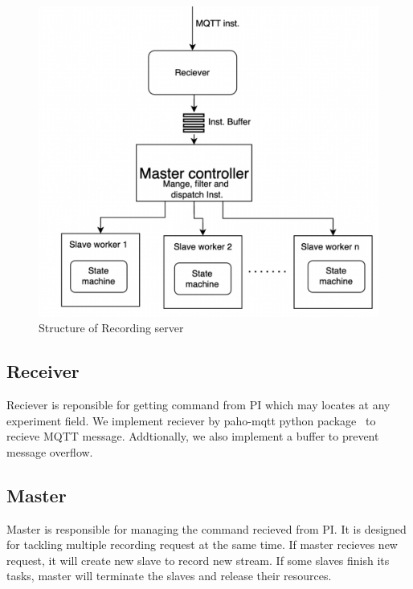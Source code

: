 \begin{figure}[H]
    \centering
    \includegraphics[width=\textwidth]{figsrc/recording-server-diagram.png}
    \caption{Structure of Recording server \label{fig:recording-server-diagram}}
\end{figure}

\subsection{Receiver}
Reciever is reponsible for getting command from PI which may locates at any experiment field. We implement reciever by paho-mqtt python package~\cite{paho-mqtt} to recieve MQTT message. Addtionally, we also implement a buffer to prevent message overflow.

\subsection{Master}
Master is responsible for managing the command recieved from PI. It is designed for tackling multiple recording request at the same time. If master recieves new request, it will create new slave to record new stream. If some slaves finish its tasks, master will terminate the slaves and release their resources.

